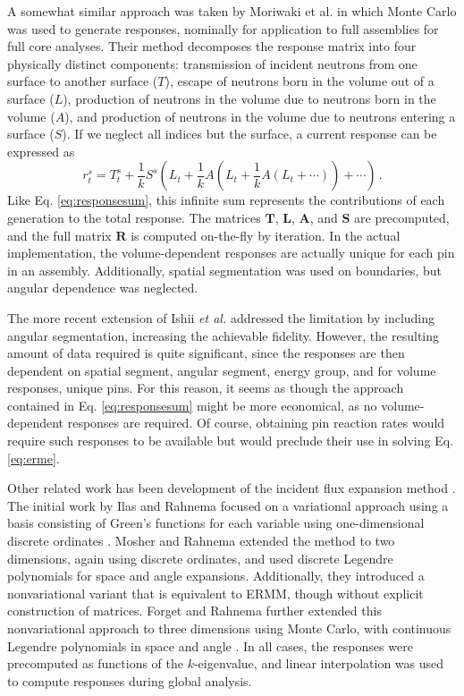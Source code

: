 A somewhat similar approach was taken by Moriwaki et al. 
\cite{moriwaki1999ndc}
in which Monte Carlo was used to 
generate responses, nominally for application to
full assemblies for full core analyses. 
Their method decomposes the response
matrix into four physically distinct components: 
transmission of incident neutrons from one surface to another surface ($T$), 
escape of neutrons born in the volume out of a surface ($L$), 
production of neutrons in the volume due to neutrons born in the volume ($A$), 
and production of neutrons in the volume due to neutrons 
entering a surface ($S$). If we neglect all indices but the 
surface, a current response can be expressed as
\begin{equation}
 r^{s}_{t} = T^s_t + \frac{1}{k}S^s(L_t + \frac{1}{k}A(L_t 
                   + \frac{1}{k}A(L_t + \cdots )) + \cdots) \, .
\label{eq:responseiterate}
\end{equation}
Like Eq. \ref{eq:responsesum}, this infinite sum 
represents the contributions of each generation to the 
total response.  The
matrices $\mathbf{T}$, $\mathbf{L}$, $\mathbf{A}$, and $\mathbf{S}$ 
are precomputed, and the full matrix $\mathbf{R}$ is
computed on-the-fly by iteration.  In the actual
implementation, the volume-dependent responses are
actually unique for each pin in an assembly.  
Additionally, spatial segmentation was used on
boundaries, but angular dependence was neglected.

The more
recent extension of Ishii {\it et al.} addressed the 
limitation by including angular
segmentation, increasing the achievable 
fidelity. However, the resulting amount of data required
is quite significant, since the responses are then
dependent on spatial segment, angular segment, energy
group, and for volume responses, unique pins.
For this
reason, it seems as though the approach contained 
in Eq. \ref{eq:responsesum} might be more economical, as
no volume-dependent responses are required.  Of course,
obtaining pin reaction rates would require such 
responses to be available but would preclude their
use in solving Eq. \ref{eq:erme}.  

Other related work has been development of the incident
flux expansion method \cite{ilas2003hcm,mosher2006ifr}. The
initial work by Ilas and Rahnema focused on a variational
approach using a basis consisting of Green's functions
for each variable using one-dimensional discrete 
ordinates \cite{ilas2003hcm}.  Mosher and Rahnema extended the 
method to two dimensions, again using discrete ordinates,
and used discrete Legendre polynomials for space
and angle expansions.  Additionally, they
introduced a nonvariational 
variant that is equivalent to ERMM, though 
without explicit construction of matrices.  Forget and Rahnema
further extended this nonvariational approach to
three dimensions using Monte Carlo, with continuous
Legendre polynomials in space and angle \cite{forget2006tdh}.
In all cases, the responses were precomputed as functions
of the $k$-eigenvalue, and linear interpolation was
used to compute responses during global analysis.

